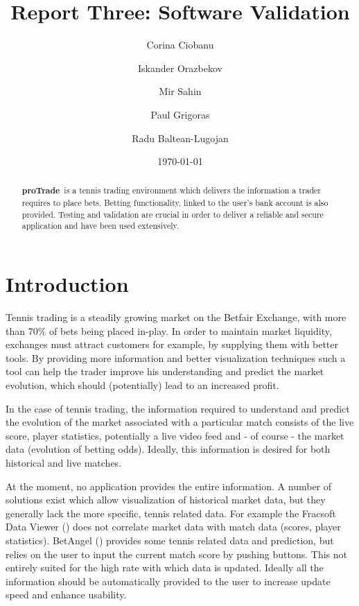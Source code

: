 \documentclass[10pt]{article}
\newcommand{\nm}{{\bf proTrade}}
\newcommand{\nmsp}{{\nm \ }}
\begin{document}
\title{Report Three: Software Validation}

\author{Corina Ciobanu \and Iskander Orazbekov \and Mir Sahin \and Paul Grigoras \and Radu Baltean-Lugojan}

\date{\today}         %

\maketitle            %

\begin{abstract}
  \nmsp is a tennis trading environment which delivers the information a trader requires to place bets. Betting functionality, linked to the user's bank account is also provided. Testing and validation are crucial in order to deliver a reliable and secure application and have been used extensively.
\end{abstract}

\tableofcontents

\section{Introduction}
Tennis trading is a steadily growing market on the Betfair Exchange, with more than 70\% of bets being placed in-play. In order to maintain market liquidity, exchanges must attract customers for example, by supplying them with better tools. By providing more information and better visualization techniques such a tool can help the trader improve his understanding and predict the market evolution, which should (potentially) lead to an increased profit.

In the case of tennis trading, the information required to understand and predict the evolution of the market associated with a particular match consists of the live score, player statistics, potentially a live video feed and - of course - the market data (evolution of betting odds). Ideally, this information is desired for both historical and live matches.

At the moment, no application provides the entire information. A number of solutions exist which allow visualization of historical market data, but they generally lack the more specific, tennis related data. For example the Fracsoft Data Viewer (\cite{site-fracsoft}) does not correlate market data with match data (scores, player statistics). BetAngel (\cite{site-betangel}) provides some tennis related data and prediction, but relies on the user to input the current match score by pushing buttons. This not entirely suited for the high rate with which data is updated. Ideally all the information should be automatically provided to the user to increase update speed and enhance usability.
\end{document}

